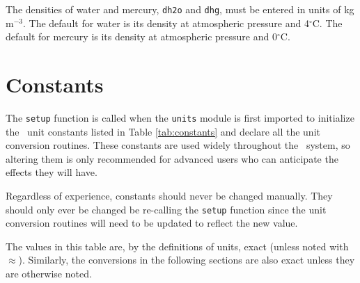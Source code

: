 The densities of water and mercury, \verb|dh2o| and \verb|dhg|, must be entered in units of kg m$^{-3}$.  The default for water is its density at atmospheric pressure and 4$^\circ$C.  The default for mercury is its density at atmospheric pressure and 0$^\circ$C.

\section{Constants}\label{sec:units:constants}

The \verb|setup| function is called when the \verb|units| module is first imported to initialize the \PM\ unit constants listed in Table \ref{tab:constants} and declare all the unit conversion routines.  These constants are used widely throughout the \PM\ system, so altering them is only recommended for advanced users who can anticipate the effects they will have.  

Regardless of experience, constants should never be changed manually.  They should only ever be changed be re-calling the \verb|setup| function since the unit conversion routines will need to be updated to reflect the new value.

The values in this table are, by the definitions of units, exact (unless noted with $\approx$).  Similarly, the conversions in the following sections are also exact unless they are otherwise noted.

